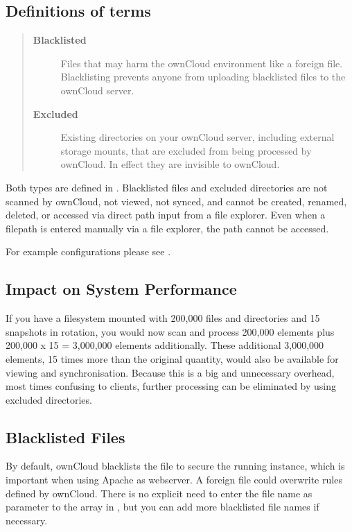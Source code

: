 \documentclass[letterpaper,10pt,english]{sphinxmanual}
\begin{document}
\subsection{Definitions of terms}
\label{configuration_server/excluded_blacklisted_files:definitions-of-terms}\begin{quote}\begin{description}
\item[{\textbf{Blacklisted}}] \leavevmode
Files that may harm the ownCloud environment like a foreign  file. Blacklisting prevents anyone from uploading blacklisted files to the ownCloud server.

\item[{\textbf{Excluded}}] \leavevmode
Existing directories on your ownCloud server, including external storage mounts, that are excluded from being processed by ownCloud. In effect they are invisible to ownCloud.

\end{description}\end{quote}

Both types are defined in . Blacklisted files and excluded directories are not scanned by ownCloud, not viewed, not synced, and cannot be created, renamed, deleted, or accessed via direct path input from a file explorer. Even when a filepath is entered manually via a file explorer, the path cannot be accessed.

For example configurations please see .


\subsection{Impact on System Performance}
\label{configuration_server/excluded_blacklisted_files:impact-on-system-performance}
If you have a filesystem mounted with 200,000 files and directories and 15 snapshots in rotation, you would now scan and process 200,000 elements plus 200,000 x 15 = 3,000,000 elements additionally. These additional 3,000,000 elements, 15 times more than the original quantity, would also be available for viewing and synchronisation. Because this is a big and unnecessary overhead, most times confusing to clients, further processing can be eliminated by using excluded directories.


\subsection{Blacklisted Files}
\label{configuration_server/excluded_blacklisted_files:blacklisted-files}
By default, ownCloud blacklists the file  to secure the running instance, which is important when using Apache as webserver. A foreign  file could overwrite rules defined by ownCloud. There is no explicit need to enter the file name  as parameter to the  array in , but you can add more blacklisted file names if necessary.
\end{document}
